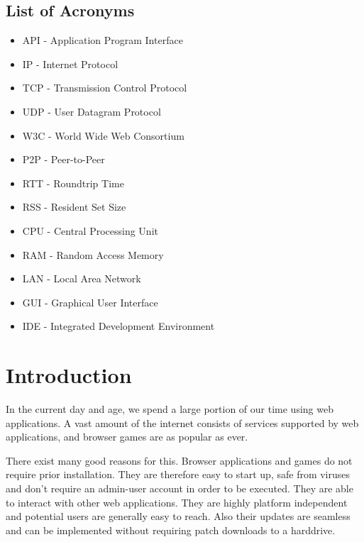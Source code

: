 \documentclass[bsc,frontabs,twoside,singlespacing,parskip,deptreport]{infthesis}     %
\begin{document}
\section*{List of Acronyms}
\begin{itemize}
\item API - Application Program Interface
\item IP - Internet Protocol
\item TCP - Transmission Control Protocol
\item UDP - User Datagram Protocol
\item W3C - World Wide Web Consortium
\item P2P - Peer-to-Peer
\item RTT - Roundtrip Time
\item RSS - Resident Set Size
\item CPU - Central Processing Unit
\item RAM - Random Access Memory
\item LAN - Local Area Network
\item GUI - Graphical User Interface
\item IDE - Integrated Development Environment
\end{itemize}

\tableofcontents




\chapter{Introduction}
In the current day and age, we spend a large portion of our time using web applications. A vast amount of the internet consists of services supported by web applications, and browser games are as popular as ever.

There exist many good reasons for this. Browser applications and games do not require prior installation. They are therefore easy to start up, safe from viruses and don't require an admin-user account in order to be executed\cite{Web_Apps_Superior}. They are able to interact with other web applications. They are highly platform independent and potential users are generally easy to reach. Also their updates are seamless and can be implemented without requiring patch downloads to a harddrive.
\end{document}
